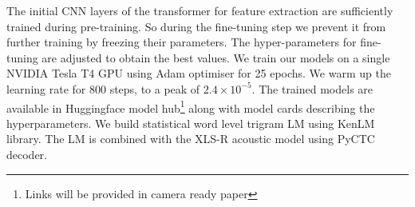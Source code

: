 \documentclass[runningheads]{llncs}
\begin{document}
The initial CNN layers of the transformer for feature extraction are sufficiently trained during pre-training. So during the fine-tuning step we prevent it from further training by freezing their parameters. The hyper-parameters  for fine-tuning are adjusted to obtain the best values. We train our models on a single NVIDIA Tesla T4 GPU using Adam optimiser for 25 epochs. We warm up the learning rate for 800 steps, to a peak of $2.4 \times 10^{−5}$. The trained models are available in Huggingface model hub\footnote{Links will be provided in camera ready paper} along with model cards describing the hyperparameters. We build statistical word level trigram LM using KenLM \cite{heafield2011kenlm} library. The LM is combined with the XLS-R acoustic model using PyCTC decoder.






\end{document}
